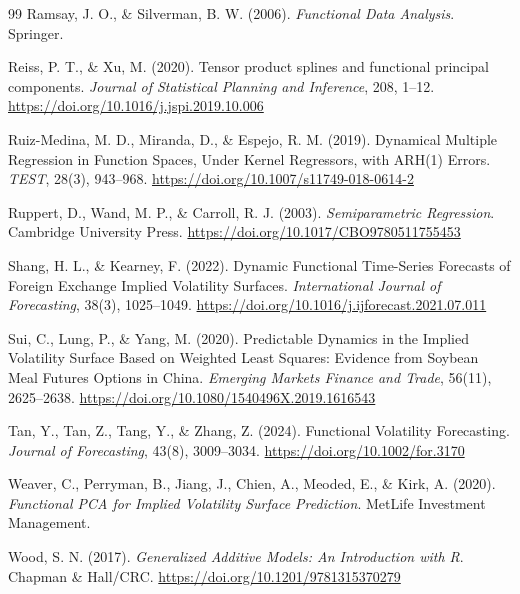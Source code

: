 \documentclass[12pt,a4paper]{article}
\begin{document}
\begin{thebibliography}{99}
Ramsay, J. O., \& Silverman, B. W. (2006). \emph{Functional Data Analysis}. Springer.

Reiss, P. T., \& Xu, M. (2020). Tensor product splines and functional principal components. \emph{Journal of Statistical Planning and Inference}, 208, 1--12. \url{https://doi.org/10.1016/j.jspi.2019.10.006}

Ruiz-Medina, M. D., Miranda, D., \& Espejo, R. M. (2019). Dynamical Multiple Regression in Function Spaces, Under Kernel Regressors, with ARH(1) Errors. \emph{TEST}, 28(3), 943--968. \url{https://doi.org/10.1007/s11749-018-0614-2}

Ruppert, D., Wand, M. P., \& Carroll, R. J. (2003). \emph{Semiparametric Regression}. Cambridge University Press. \url{https://doi.org/10.1017/CBO9780511755453}

Shang, H. L., \& Kearney, F. (2022). Dynamic Functional Time-Series Forecasts of Foreign Exchange Implied Volatility Surfaces. \emph{International Journal of Forecasting}, 38(3), 1025--1049. \url{https://doi.org/10.1016/j.ijforecast.2021.07.011}

Sui, C., Lung, P., \& Yang, M. (2020). Predictable Dynamics in the Implied Volatility Surface Based on Weighted Least Squares: Evidence from Soybean Meal Futures Options in China. \emph{Emerging Markets Finance and Trade}, 56(11), 2625--2638. \url{https://doi.org/10.1080/1540496X.2019.1616543}

Tan, Y., Tan, Z., Tang, Y., \& Zhang, Z. (2024). Functional Volatility Forecasting. \emph{Journal of Forecasting}, 43(8), 3009--3034. \url{https://doi.org/10.1002/for.3170}

Weaver, C., Perryman, B., Jiang, J., Chien, A., Meoded, E., \& Kirk, A. (2020). \emph{Functional PCA for Implied Volatility Surface Prediction}. MetLife Investment Management.

Wood, S. N. (2017). \emph{Generalized Additive Models: An Introduction with R}. Chapman \& Hall/CRC. \url{https://doi.org/10.1201/9781315370279}

\end{thebibliography}
\end{document}
